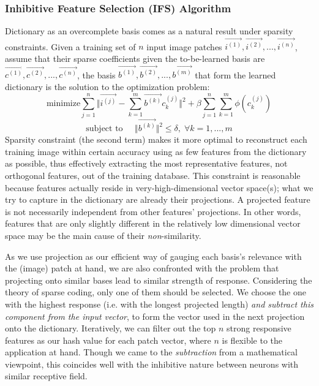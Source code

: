 \documentclass[letterpaper]{article}
\begin{document}
\subsubsection{Inhibitive Feature Selection (IFS) Algorithm}
Dictionary as an overcomplete basis comes as a natural result under sparsity constraints. Given a training set of $n$ input image patches $\overrightarrow{i^{(1)}},\overrightarrow{i^{(2)}},...,\overrightarrow{i^{(n)}}$, assume that their sparse coefficients given the to-be-learned basis are $\overrightarrow{c^{(1)}},\overrightarrow{c^{(2)}},...,\overrightarrow{c^{(n)}}$, the basis $\overrightarrow{b^{(1)}},\overrightarrow{b^{(2)}},...,\overrightarrow{b^{(m)}}$ that form the learned dictionary is the solution to the optimization problem:
\[\mbox{minimize}\sum_{j=1}^{n}\Vert \overrightarrow{i^{(j)}}-\sum_{k=1}^{m}\overrightarrow{b^{(k)}}c_k^{(j)}\Vert^2 + \beta \sum_{j=1}^{n}\sum_{k=1}^{m}\phi(c_k^{(j)})\]
\[\mbox{subject to}\;\;\;\;\; \Vert\overrightarrow{b^{(k)}}\Vert^2 \leq \delta,\; \forall k=1,...,m\]
Sparsity constraint (the second term) makes it more optimal to reconstruct each training image within certain accuracy using as few features from the dictionary as possible, thus effectively extracting the most representative features, not orthogonal features, out of the training database. This constraint is reasonable because features actually reside in very-high-dimensional vector space(s); what we try to capture in the dictionary are already their projections. A projected feature is not necessarily independent from other features' projections. In other words, features that are only slightly different in the relatively low dimensional vector space may be the main cause of their \emph{non}-similarity.

As we use projection as our efficient way of gauging each basis's relevance with the (image) patch at hand, we are also confronted with the problem that projecting onto similar bases lead to similar strength of response. Considering the theory of sparse coding, only one of them should be selected. We choose the one with the highest response (i.e. with the longest projected length) \emph{and subtract this component from the input vector}, to form the vector used in the next projection onto the dictionary. Iteratively, we can filter out the top $n$ strong responsive features as our hash value for each patch vector, where $n$ is flexible to the application at hand. Though we came to the \emph{subtraction} from a mathematical viewpoint, this coincides well with the inhibitive nature between neurons with similar receptive field.
\end{document}
